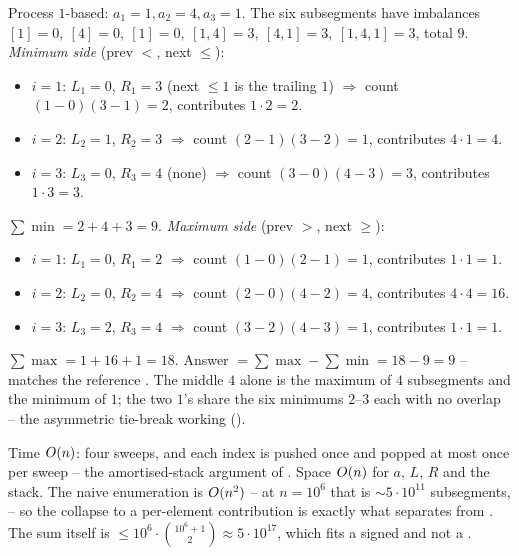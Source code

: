 \begin{tracebox}
Process $1$-based: $a_1=1,a_2=4,a_3=1$. The six subsegments have imbalances
$[1]{=}0,\ [4]{=}0,\ [1]{=}0,\ [1,4]{=}3,\ [4,1]{=}3,\ [1,4,1]{=}3$, total $9$.
\emph{Minimum side} (prev $<$, next $\le$):
\begin{itemize}[nosep,leftmargin=1.3em]
  \item $i=1$: $L_1{=}0$, $R_1{=}3$ (next $\le 1$ is the trailing $1$) $\Rightarrow$ count $(1{-}0)(3{-}1){=}2$,
        contributes $1\cdot2{=}2$. \checkmark
  \item $i=2$: $L_2{=}1$, $R_2{=}3$ $\Rightarrow$ count $(2{-}1)(3{-}2){=}1$, contributes $4\cdot1{=}4$. \checkmark
  \item $i=3$: $L_3{=}0$, $R_3{=}4$ (none) $\Rightarrow$ count $(3{-}0)(4{-}3){=}3$, contributes $1\cdot3{=}3$. \checkmark
\end{itemize}
$\sum\min=2+4+3=9$. \emph{Maximum side} (prev $>$, next $\ge$):
\begin{itemize}[nosep,leftmargin=1.3em]
  \item $i=1$: $L_1{=}0$, $R_1{=}2$ $\Rightarrow$ count $(1{-}0)(2{-}1){=}1$, contributes $1\cdot1{=}1$. \checkmark
  \item $i=2$: $L_2{=}0$, $R_2{=}4$ $\Rightarrow$ count $(2{-}0)(4{-}2){=}4$, contributes $4\cdot4{=}16$. \checkmark
  \item $i=3$: $L_3{=}2$, $R_3{=}4$ $\Rightarrow$ count $(3{-}2)(4{-}3){=}1$, contributes $1\cdot1{=}1$. \checkmark
\end{itemize}
$\sum\max=1+16+1=18$. Answer $=\sum\max-\sum\min=18-9=9$ -- matches the reference \checkmark. The middle
$4$ alone is the maximum of $4$ subsegments and the minimum of $1$; the two $1$'s share the six minimums
$2$--$3$ each with no overlap -- the asymmetric tie-break working ().
\end{tracebox}

\begin{complexitybox}
Time $O(n)$: four sweeps, and each index is pushed once and popped at most once per sweep -- the
amortised-stack argument of . Space $O(n)$ for $a$, $L$, $R$ and the stack.
The naive enumeration is $O(n^2)$ -- at $n=10^{6}$ that is $\sim5\cdot10^{11}$ subsegments, \tle -- so
the collapse to a per-element contribution is exactly what separates \ac{} from \tle. The sum itself is
$\le 10^{6}\cdot\binom{10^{6}+1}{2}\approx5\cdot10^{17}$, which fits a signed  and not a
.
\end{complexitybox}

